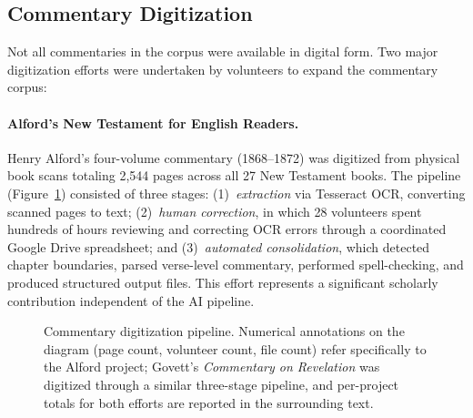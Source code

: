 \subsection{Commentary Digitization}

Not all commentaries in the corpus were available in digital form. Two major digitization efforts were undertaken by volunteers to expand the commentary corpus:

\paragraph{Alford's New Testament for English Readers.} Henry Alford's four-volume commentary (1868--1872) was digitized from physical book scans totaling 2{,}544 pages across all 27 New Testament books. The pipeline (Figure~\ref{fig:digitization}) consisted of three stages: (1)~\textit{extraction} via Tesseract OCR, converting scanned pages to text; (2)~\textit{human correction}, in which 28 volunteers spent hundreds of hours reviewing and correcting OCR errors through a coordinated Google Drive spreadsheet; and (3)~\textit{automated consolidation}, which detected chapter boundaries, parsed verse-level commentary, performed spell-checking, and produced structured output files. This effort represents a significant scholarly contribution independent of the AI pipeline.

\begin{figure}[t]
\centering
{}
\caption{Commentary digitization pipeline. Numerical annotations on the diagram (page count, volunteer count, file count) refer specifically to the Alford project; Govett's \textit{Commentary on Revelation} was digitized through a similar three-stage pipeline, and per-project totals for both efforts are reported in the surrounding text.}
\label{fig:digitization}
\end{figure}

